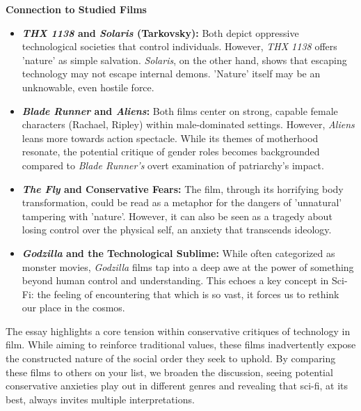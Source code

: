 \documentclass[11pt,fleqn]{book}
\begin{document}
\vspace{5pt}
\textbf{Connection to Studied Films}

\begin{itemize}
\item \textbf{\textit{THX 1138} and \textit{Solaris} (Tarkovsky):} Both depict oppressive technological societies that control individuals. However, \textit{THX 1138} offers 'nature' as simple salvation.  \textit{Solaris}, on the other hand,  shows that escaping technology may not escape internal demons.  'Nature' itself may be an unknowable, even hostile force.

\item \textbf{\textit{Blade Runner} and \textit{Aliens}:}  Both films center on strong, capable female characters (Rachael, Ripley) within male-dominated settings.  However, \textit{Aliens} leans more towards action spectacle. While its themes of motherhood resonate, the potential critique of gender roles becomes backgrounded compared to \textit{Blade Runner's} overt examination of patriarchy's impact.

\item \textbf{\textit{The Fly} and Conservative Fears:}  The film, through its horrifying body transformation, could be read as a metaphor for the dangers of 'unnatural' tampering  with 'nature'. However, it can also be seen as a tragedy about losing control over the physical self, an anxiety that transcends ideology.

\item \textbf{\textit{Godzilla} and the Technological Sublime:}  While often categorized as monster movies, \textit{Godzilla} films tap into a deep awe at the power of something beyond human control and understanding. This echoes a key concept in Sci-Fi: the feeling of encountering that which is so vast, it forces us to rethink our place in the cosmos. 
\end{itemize}

\vspace{5pt}

The essay highlights a core tension within conservative critiques of technology in film. While aiming to reinforce traditional values, these films inadvertently expose the constructed nature of the social order they seek to uphold.  By comparing these films to others on your list, we broaden the discussion, seeing potential conservative anxieties play out in different genres and revealing that sci-fi, at its best, always invites multiple interpretations. 
\end{document}
